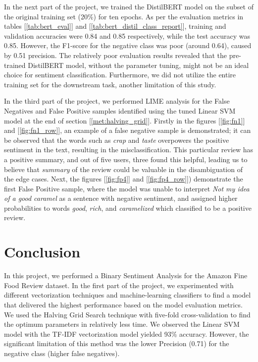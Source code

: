 \documentclass[11pt]{article}
\begin{document}
In the next part of the project, we trained the DistilBERT model on the subset of the original training set (20\%) for ten epochs. As per the evaluation metrics in tables [\ref{tab:bert_eval}] and [\ref{tab:bert_distil_class_report}], training and validation accuracies were 0.84 and 0.85 respectively, while the test accuracy was 0.85. However, the F1-score for the negative class was poor (around 0.64), caused by 0.51 precision. The relatively poor evaluation results revealed that the pre-trained DistilBERT model, without the parameter tuning, might not be an ideal choice for sentiment classification. Furthermore, we did not utilize the entire training set for the downstream task, another limitation of this study.

In the third part of the project, we performed LIME analysis for the False Negatives and False Positive samples identified using the tuned Linear SVM model at the end of section [\ref{met:halving_grid}]. Firstly in the figures [\ref{fig:fn1}] and [\ref{fig:fn1_row}], an example of a false negative sample is demonstrated; it can be observed that the words such as \textit{crap} and \textit{taste} overpowers the positive sentiment in the text, resulting in the misclassification. This particular review has a positive summary, and out of five users, three found this helpful, leading us to believe that \textit{summary} of the review could be valuable in  the disambiguation of the edge cases. Next, the figures [\ref{fig:fp4}] and [\ref{fig:fp4_row}]) demonstrate the first False Positive sample, where the model was unable to interpret \textit{Not my idea of a good caramel} as a sentence with negative sentiment, and assigned higher probabilities to words \textit{good}, \textit{rich}, and \textit{caramelized} which classified to be a positive review.

 
 \section{Conclusion}
In this project, we performed a Binary Sentiment Analysis for the Amazon Fine Food Review dataset. In the first part of the project, we experimented with different vectorization techniques and machine-learning classifiers to find a model that delivered the highest performance based on the model evaluation metrics. We used the Halving Grid Search technique with five-fold cross-validation to find the optimum parameters in relatively less time. We observed the Linear SVM model with the TF-IDF vectorization model yielded 93\% accuracy. However, the significant limitation of this method was the lower Precision (0.71) for the negative class (higher false negatives). 
\end{document}
